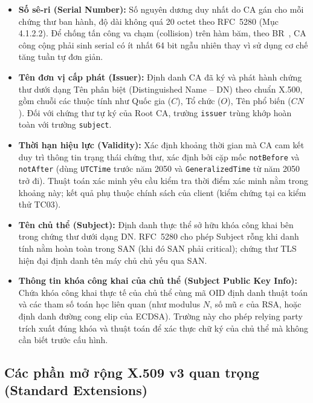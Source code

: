 \begin{itemize}
    \item \textbf{Số sê-ri (Serial Number):} Số nguyên dương duy nhất do CA gán cho mỗi chứng thư ban hành, độ dài không quá 20 octet theo RFC~5280 (Mục 4.1.2.2). Để chống tấn công va chạm (collision) trên hàm băm, theo BR~\cite{cabforum_br}, CA công cộng phải sinh serial có ít nhất 64 bit ngẫu nhiên thay vì sử dụng cơ chế tăng tuần tự đơn giản.

    \item \textbf{Tên đơn vị cấp phát (Issuer):} Định danh CA đã ký và phát hành chứng thư dưới dạng Tên phân biệt (Distinguished Name -- DN) theo chuẩn X.500, gồm chuỗi các thuộc tính như Quốc gia ($C$), Tổ chức ($O$), Tên phổ biến ($CN$). Đối với chứng thư tự ký của Root CA, trường \texttt{issuer} trùng khớp hoàn toàn với trường \texttt{subject}.

    \item \textbf{Thời hạn hiệu lực (Validity):} Xác định khoảng thời gian mà CA cam kết duy trì thông tin trạng thái chứng thư, xác định bởi cặp mốc \texttt{notBefore} và \texttt{notAfter} (dùng \texttt{UTCTime} trước năm 2050 và \texttt{GeneralizedTime} từ năm 2050 trở đi). Thuật toán xác minh yêu cầu kiểm tra thời điểm xác minh nằm trong khoảng này; kết quả phụ thuộc chính sách của client (kiểm chứng tại ca kiểm thử TC03).

    \item \textbf{Tên chủ thể (Subject):} Định danh thực thể sở hữu khóa công khai bên trong chứng thư dưới dạng DN. RFC~5280 cho phép Subject rỗng khi danh tính nằm hoàn toàn trong SAN (khi đó SAN phải critical); chứng thư TLS hiện đại định danh tên máy chủ chủ yếu qua SAN.

    \item \textbf{Thông tin khóa công khai của chủ thể (Subject Public Key Info):} Chứa khóa công khai thực tế của chủ thể cùng mã OID định danh thuật toán và các tham số toán học liên quan (như modulus $N$, số mũ $e$ của RSA, hoặc định danh đường cong elip của ECDSA). Trường này cho phép relying party trích xuất đúng khóa và thuật toán để xác thực chữ ký của chủ thể mà không cần biết trước cấu hình.
\end{itemize}

\subsection{Các phần mở rộng X.509 v3 quan trọng (Standard Extensions)}
\label{subsec:standard-extensions}

